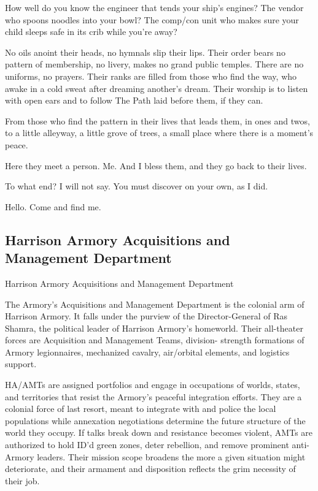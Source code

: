 How well do you know the engineer that tends your ship’s engines? The vendor who spoons
noodles into your bowl? The comp/con unit who makes sure your child sleeps safe in its crib
while you’re away?

No oils anoint their heads, no hymnals slip their lips. Their order bears no pattern of membership,
no livery, makes no grand public temples. There are no uniforms, no prayers. Their ranks are filled
from those who find the way, who awake in a cold sweat after dreaming another’s dream. Their
worship is to listen with open ears and to follow The Path laid before them, if they can.

From those who find the pattern in their lives that leads them, in ones and twos, to a little
alleyway, a little grove of trees, a small place where there is a moment’s peace.

Here they meet a person. Me. And I bless them, and they go back to their lives.

To what end? I will not say. You must discover on your own, as I did.

Hello. Come and find me.

\subsection{Harrison Armory Acquisitions and Management Department}
Harrison Armory Acquisitions and Management Department

The Armory’s Acquisitions and Management Department is the colonial arm of Harrison Armory.
It falls under the purview of the Director-General of Ras Shamra, the political leader of Harrison
Armory’s homeworld. Their all-theater forces are Acquisition and Management Teams, division-
strength formations of Armory legionnaires, mechanized cavalry, air/orbital elements, and
logistics support.


HA/AMTs are assigned portfolios and engage in occupations of worlds, states, and territories
that resist the Armory’s peaceful integration efforts. They are a colonial force of last resort, meant
to integrate with and police the local populations while annexation negotiations determine the
future structure of the world they occupy. If talks break down and resistance becomes violent,
AMTs are authorized to hold ID’d green zones, deter rebellion, and remove prominent anti-
Armory leaders. Their mission scope broadens the more a given situation might deteriorate, and
their armament and disposition reflects the grim necessity of their job.


